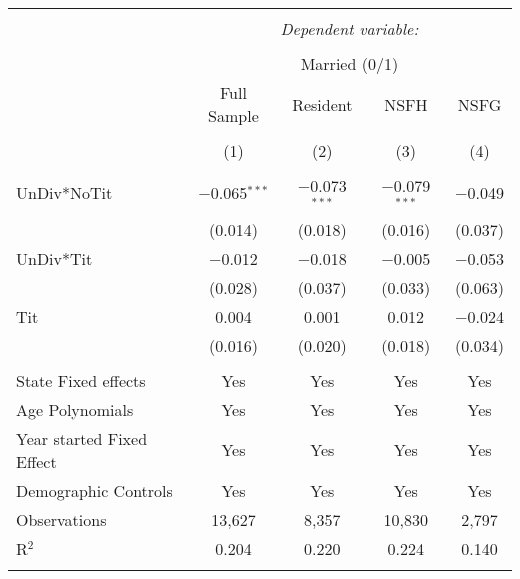
\begingroup 
\footnotesize 
\begin{tabular}{@{\extracolsep{5pt}}lcccc} 
\\[-1.8ex]\hline 
\hline \\[-1.8ex] 
 & \multicolumn{4}{c}{\textit{Dependent variable:}} \\ 
\cline{2-5} 
\\[-1.8ex] & \multicolumn{4}{c}{Married (0/1)} \\ 
 & Full Sample & Resident & NSFH & NSFG \\ 
\\[-1.8ex] & (1) & (2) & (3) & (4)\\ 
\hline \\[-1.8ex] 
 UnDiv*NoTit & $-$0.065$^{***}$ & $-$0.073$^{***}$ & $-$0.079$^{***}$ & $-$0.049 \\ 
  & (0.014) & (0.018) & (0.016) & (0.037) \\ 
  UnDiv*Tit & $-$0.012 & $-$0.018 & $-$0.005 & $-$0.053 \\ 
  & (0.028) & (0.037) & (0.033) & (0.063) \\ 
  Tit & 0.004 & 0.001 & 0.012 & $-$0.024 \\ 
  & (0.016) & (0.020) & (0.018) & (0.034) \\ 
 \hline \\[-1.8ex] 
State Fixed effects & Yes & Yes & Yes & Yes \\ 
Age Polynomials & Yes & Yes & Yes & Yes \\ 
Year started Fixed Effect & Yes & Yes & Yes & Yes \\ 
Demographic Controls & Yes & Yes & Yes & Yes \\ 
Observations & 13,627 & 8,357 & 10,830 & 2,797 \\ 
R$^{2}$ & 0.204 & 0.220 & 0.224 & 0.140 \\ 
\hline 
\hline \\[-1.8ex] 
\end{tabular} 
\endgroup 
